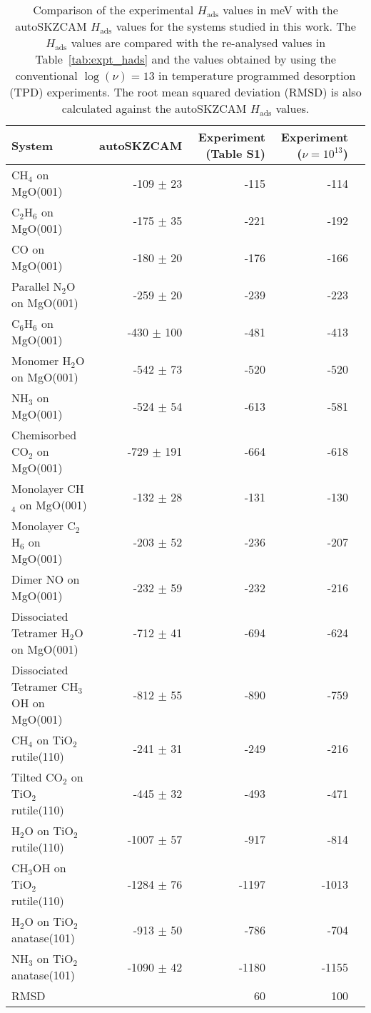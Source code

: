 \begin{table}
\caption{\label{tab:hads_nu13_comparison}Comparison of the experimental $H_\textrm{ads}$ values in meV with the autoSKZCAM $H_\textrm{ads}$ values for the systems studied in this work. The $H_\textrm{ads}$ values are compared with the re-analysed values in Table~\ref{tab:expt_hads} and the values obtained by using the conventional $\log(\nu)=13$ in temperature programmed desorption (TPD) experiments. The root mean squared deviation (RMSD) is also calculated against the autoSKZCAM $H_\textrm{ads}$ values.}
\begin{adjustbox}{center,max width=1\textwidth}
\begin{tabular}{lrrrr}
\toprule
System & autoSKZCAM & Experiment (Table S1) & Experiment ($\nu{=}10^{13}$) \\ 
\midrule
CH$_4$ on MgO(001) & -109 $\pm$ 23 & -115 & -114 \\
C$_2$H$_6$ on MgO(001) & -175 $\pm$ 35 & -221 & -192 \\
CO on MgO(001) & -180 $\pm$ 20 & -176 & -166 \\
Parallel N$_2$O on MgO(001) & -259 $\pm$ 20 & -239 & -223 \\
C$_6$H$_6$ on MgO(001) & -430 $\pm$ 100 & -481 & -413 \\
Monomer H$_2$O on MgO(001) & -542 $\pm$ 73 & -520 & -520 \\
NH$_3$ on MgO(001) & -524 $\pm$ 54 & -613 & -581 \\
Chemisorbed CO$_2$ on MgO(001) & -729 $\pm$ 191 & -664 & -618 \\
Monolayer CH$_4$ on MgO(001) & -132 $\pm$ 28 & -131 & -130 \\
Monolayer C$_2$H$_6$ on MgO(001) & -203 $\pm$ 52 & -236 & -207 \\
Dimer NO on MgO(001) & -232 $\pm$ 59 & -232 & -216 \\
Dissociated Tetramer H$_2$O on MgO(001) & -712 $\pm$ 41 & -694 & -624 \\
Dissociated Tetramer CH$_3$OH on MgO(001) & -812 $\pm$ 55 & -890 & -759 \\
CH$_4$ on TiO$_2$ rutile(110) & -241 $\pm$ 31 & -249 & -216 \\
Tilted CO$_2$ on TiO$_2$ rutile(110) & -445 $\pm$ 32 & -493 & -471 \\
H$_2$O on TiO$_2$ rutile(110) & -1007 $\pm$ 57 & -917 & -814 \\
CH$_3$OH on TiO$_2$ rutile(110) & -1284 $\pm$ 76 & -1197 & -1013 \\
H$_2$O on TiO$_2$ anatase(101) & -913 $\pm$ 50 & -786 & -704 \\
NH$_3$ on TiO$_2$ anatase(101) & -1090 $\pm$ 42 & -1180 & -1155 \\
RMSD &  & 60 & 100 \\
\bottomrule
\end{tabular}
\end{adjustbox}
\end{table}
